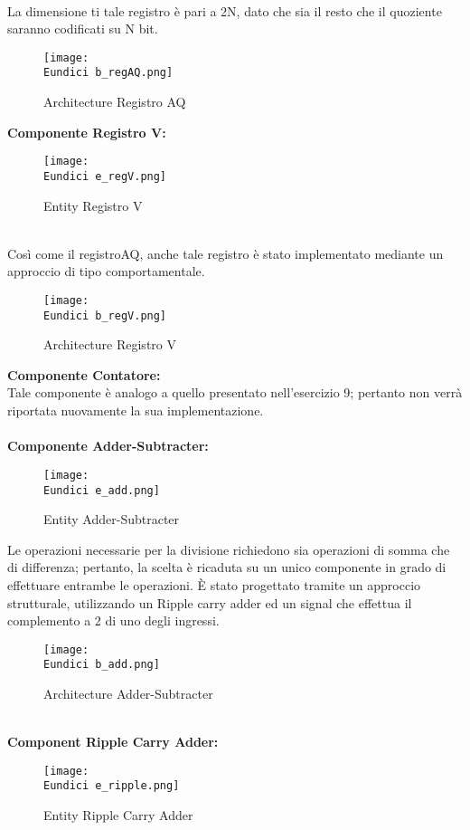 \documentclass[12pt]{article}
\def \Eundici{Allegati/Esercizio11/}
\begin{document}
\\La dimensione ti tale registro è pari a 2N, dato che sia il resto che il quoziente saranno codificati su N bit.
\clearpage
\begin{figure}[ht!]
    \centering
    \texttt{[image: \\Eundici b\_regAQ.png]}
    \caption{Architecture Registro AQ}
\end{figure}
{\large \textbf{Componente Registro V:}}
\begin{figure}[ht!]
    \centering
    \texttt{[image: \\Eundici e\_regV.png]}
    \caption{Entity Registro V}
\end{figure}
\\Così come il registroAQ, anche tale registro è stato implementato mediante un approccio di tipo comportamentale.
\clearpage
\begin{figure}[ht!]
    \centering
    \texttt{[image: \\Eundici b\_regV.png]}
    \caption{Architecture Registro V}
\end{figure}
{\large \textbf{Componente Contatore:}}
\\Tale componente è analogo a quello presentato nell’esercizio 9; pertanto non verrà riportata nuovamente la sua implementazione.
\\\\{\large \textbf{Componente Adder-Subtracter:}}
\begin{figure}[ht!]
    \centering
    \texttt{[image: \\Eundici e\_add.png]}
    \caption{Entity Adder-Subtracter}
\end{figure}
\clearpage
Le operazioni necessarie per la divisione richiedono sia operazioni di somma che di differenza; pertanto, la scelta è ricaduta su un unico componente in grado di effettuare entrambe le operazioni. È stato progettato tramite un approccio strutturale, utilizzando un Ripple carry adder ed un signal che effettua il complemento a 2 di uno degli ingressi.
\begin{figure}[ht!]
    \centering
    \texttt{[image: \\Eundici b\_add.png]}
    \caption{Architecture Adder-Subtracter}
\end{figure}
\vspace*{2cm}
\\{\large \textbf{Component Ripple Carry Adder:}}
\begin{figure}[ht!]
    \centering
    \texttt{[image: \\Eundici e\_ripple.png]}
    \caption{Entity Ripple Carry Adder}
\end{figure}
\end{document}
